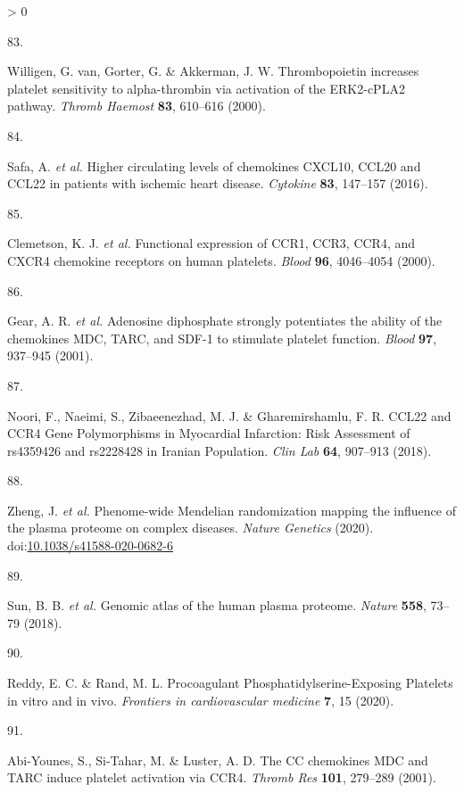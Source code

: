 \documentclass[11pt,twoside]{bristolthesis}
\newlength{\cslhangindent}
\newlength{\csllabelwidth}
\newenvironment{CSLReferences}[2] %
 {%
  \setlength{\parindent}{0pt}
  \ifodd #1 \everypar{\setlength{\hangindent}{\cslhangindent}}\ignorespaces\fi
  \ifnum #2 > 0
  \setlength{\parskip}{#2\baselineskip}
  \fi
 }%
 {}
\newcommand{\CSLLeftMargin}[1]{\parbox[t]{\csllabelwidth}{#1}}
\newcommand{\CSLRightInline}[1]{\parbox[t]{\linewidth - \csllabelwidth}{#1}\break}
\begin{document}
\begin{CSLReferences}{0}{0}
\leavevmode\hypertarget{ref-VanWilligen2000}{}%
\CSLLeftMargin{83. }
\CSLRightInline{Willigen, G. van, Gorter, G. \& Akkerman, J. W. {Thrombopoietin increases platelet sensitivity to alpha-thrombin via activation of the ERK2-cPLA2 pathway}. \emph{Thromb Haemost} \textbf{83}, 610--616 (2000).}

\leavevmode\hypertarget{ref-Safa2016}{}%
\CSLLeftMargin{84. }
\CSLRightInline{Safa, A. \emph{et al.} {Higher circulating levels of chemokines CXCL10, CCL20 and CCL22 in patients with ischemic heart disease}. \emph{Cytokine} \textbf{83}, 147--157 (2016).}

\leavevmode\hypertarget{ref-Clemetson2000}{}%
\CSLLeftMargin{85. }
\CSLRightInline{Clemetson, K. J. \emph{et al.} {Functional expression of CCR1, CCR3, CCR4, and CXCR4 chemokine receptors on human platelets}. \emph{Blood} \textbf{96}, 4046--4054 (2000).}

\leavevmode\hypertarget{ref-Gear2001}{}%
\CSLLeftMargin{86. }
\CSLRightInline{Gear, A. R. \emph{et al.} {Adenosine diphosphate strongly potentiates the ability of the chemokines MDC, TARC, and SDF-1 to stimulate platelet function}. \emph{Blood} \textbf{97}, 937--945 (2001).}

\leavevmode\hypertarget{ref-Noori2018}{}%
\CSLLeftMargin{87. }
\CSLRightInline{Noori, F., Naeimi, S., Zibaeenezhad, M. J. \& Gharemirshamlu, F. R. {CCL22 and CCR4 Gene Polymorphisms in Myocardial Infarction: Risk Assessment of rs4359426 and rs2228428 in Iranian Population}. \emph{Clin Lab} \textbf{64}, 907--913 (2018).}

\leavevmode\hypertarget{ref-Zheng2020}{}%
\CSLLeftMargin{88. }
\CSLRightInline{Zheng, J. \emph{et al.} {Phenome-wide Mendelian randomization mapping the influence of the plasma proteome on complex diseases}. \emph{Nature Genetics} (2020). doi:\href{https://doi.org/10.1038/s41588-020-0682-6}{10.1038/s41588-020-0682-6}}

\leavevmode\hypertarget{ref-Sun2018}{}%
\CSLLeftMargin{89. }
\CSLRightInline{Sun, B. B. \emph{et al.} {Genomic atlas of the human plasma proteome}. \emph{Nature} \textbf{558}, 73--79 (2018).}

\leavevmode\hypertarget{ref-Reddy2020}{}%
\CSLLeftMargin{90. }
\CSLRightInline{Reddy, E. C. \& Rand, M. L. {Procoagulant Phosphatidylserine-Exposing Platelets in vitro and in vivo}. \emph{Frontiers in cardiovascular medicine} \textbf{7}, 15 (2020).}

\leavevmode\hypertarget{ref-Abi-Younes2001}{}%
\CSLLeftMargin{91. }
\CSLRightInline{Abi-Younes, S., Si-Tahar, M. \& Luster, A. D. {The CC chemokines MDC and TARC induce platelet activation via CCR4}. \emph{Thromb Res} \textbf{101}, 279--289 (2001).}


\end{CSLReferences}
\end{document}

